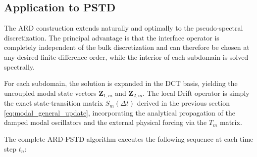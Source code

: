 \documentclass{Configuration_Files/PoliMi3i_thesis}
\begin{document}
\subsection{Application to PSTD}

The ARD construction extends naturally and optimally to the pseudo-spectral discretization. The principal advantage is that the interface operator is completely independent of the bulk discretization and can therefore be chosen at any desired finite-difference order, while the interior of each subdomain is solved spectrally.

For each subdomain, the solution is expanded in the DCT basis, yielding the uncoupled modal state vectors $\mathbf Z_{1,m}$ and $\mathbf Z_{2,m}$. The local Drift operator is simply the exact state-transition matrix $S_m(\Delta t)$ derived in the previous section \eqref{eq:modal_general_update}, incorporating the analytical propagation of the damped modal oscillators and the external physical forcing via the $T_m$ matrix.

The complete ARD-PSTD algorithm executes the following sequence at each time step $t_n$:
\end{document}

